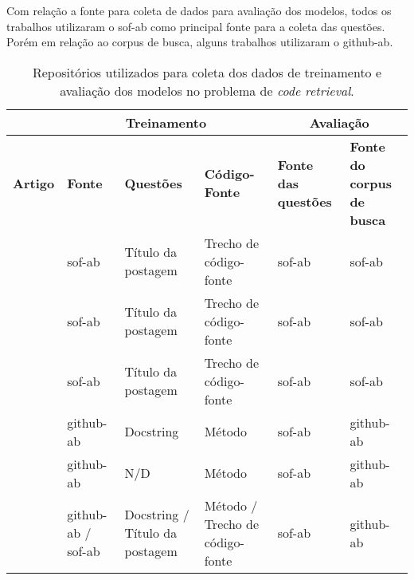 Com relação a fonte para coleta de dados para avaliação dos modelos, todos os trabalhos utilizaram o \acrfull{sof-ab} como principal fonte para a coleta das questões. Porém em relação ao corpus de busca, alguns trabalhos \citep{Gu-deep-code-search:2018, Sachdev-neural-code-search:2018, cambronero-deep-learning-code-search:2019} utilizaram o \acrfull{github-ab}.

\begin{table}[h]
\centering
\begin{tabular}{ p{8em} p{5em} p{5em} p{5em} p{5em} p{5em} }
\hline
 & \multicolumn{3}{c}{\textbf{Treinamento}} & \multicolumn{2}{c}{\textbf{Avaliação}} \\
\hline
\textbf{Artigo} & \textbf{Fonte} & \textbf{Questões} & \textbf{Código-Fonte} & \textbf{Fonte das questões} & \textbf{Fonte do corpus de busca}\\
\hline

\cite{Allamanis-bimodal-source-code-natural-language:2015} & \acrshort{sof-ab} & Título da postagem & Trecho de código-fonte & \acrshort{sof-ab} & \acrshort{sof-ab}\\

\cite{Chen-bi-variational-autoencoder:2018} & \acrshort{sof-ab} & Título da postagem & Trecho de código-fonte & \acrshort{sof-ab} & \acrshort{sof-ab}\\

\cite{iyer-etal-2016-summarizing} & \acrshort{sof-ab} & Título da postagem & Trecho de código-fonte & \acrshort{sof-ab} & \acrshort{sof-ab}\\

\cite{Gu-deep-code-search:2018} & \acrshort{github-ab} & Docstring & Método & \acrshort{sof-ab} & \acrshort{github-ab}\\

\cite{Sachdev-neural-code-search:2018} & \acrshort{github-ab} & N/D & Método	& \acrshort{sof-ab} & \acrshort{github-ab}\\

\cite{cambronero-deep-learning-code-search:2019} & \acrshort{github-ab} / \acrshort{sof-ab} & Docstring / Título da postagem & Método / Trecho de código-fonte & \acrshort{sof-ab} & \acrshort{github-ab}\\

 \hline
 
\end{tabular}
\caption{Repositórios utilizados para coleta dos dados de treinamento e avaliação dos modelos no problema de \textit{code retrieval}.}
\label{table:summary-source-data}
\end{table}


